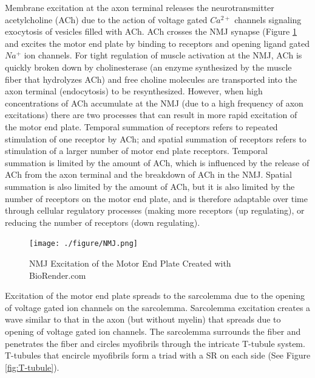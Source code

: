 Membrane excitation at the axon terminal releases the neurotransmitter acetylcholine (ACh) due to the action of voltage gated $Ca^{2+}$ channels signaling exocytosis of vesicles filled with ACh. ACh crosses the NMJ synapse (Figure \ref{fig:NMJ} and excites the motor end plate by binding to receptors and opening ligand gated $Na^+$ ion channels. For tight regulation of muscle activation at the NMJ, ACh is quickly broken down by cholinesterase (an enzyme synthesized by the muscle fiber that hydrolyzes ACh) and free choline molecules are transported into the axon terminal (endocytosis) to be resynthesized. However, when high concentrations of ACh accumulate at the NMJ (due to a high frequency of axon excitations) there are two processes that can result in more rapid excitation of the motor end plate.\footnotemark{} Temporal summation of receptors refers to repeated stimulation of one receptor by ACh; and spatial summation of receptors refers to stimulation of a larger number of motor end plate receptors. Temporal summation is limited by the amount of ACh, which is influenced by the release of ACh from the axon terminal and the breakdown of ACh in the NMJ. Spatial summation is also limited by the amount of ACh, but it is also limited by the number of receptors on the motor end plate, and is therefore adaptable over time through cellular regulatory processes (making more receptors (up regulating), or reducing the number of receptors (down regulating).


\begin{figure}[!ht]
    \centering
    \texttt{[image: ./figure/NMJ.png]}
    \caption{NMJ Excitation of the Motor End Plate \footnotesize{Created with BioRender.com}}
    \label{fig:NMJ}
\end{figure}

Excitation of the motor end plate spreads to the sarcolemma due to the opening of voltage gated ion channels on the sarcolemma. Sarcolemma excitation creates a wave similar to that in the axon (but without myelin) that spreads due to opening of voltage gated ion channels. The sarcolemma surrounds the fiber and penetrates the fiber and circles myofibrils through the intricate T-tubule system. T-tubules that encircle myofibrils form a triad with a SR on each side (See Figure \ref{fig:T-tubule}).

